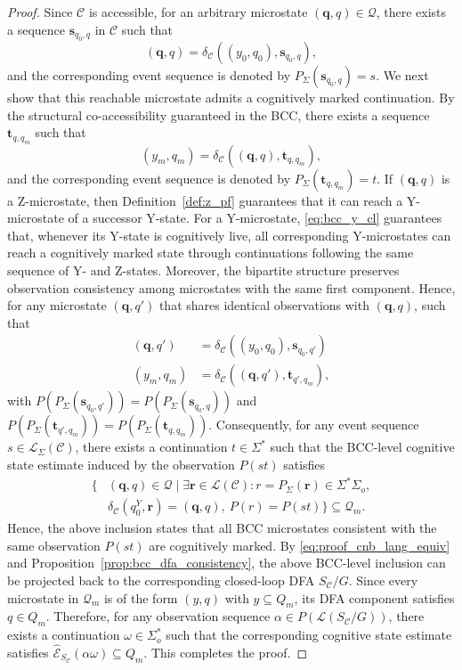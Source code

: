 \documentclass[journal,twoside,web]{ieeecolor}
\begin{document}
\begin{proof}
Since $\mathcal{C}$ is accessible, for an arbitrary microstate $(\bm{q}, q) \in \bm{\mathcal{Q}}$, there exists a sequence $\bm{s}_{q_0, q}$ in $\mathcal{C}$ such that
$$
(\bm{q}, q) = \delta_{\mathcal{C}}((y_0, q_0), \bm{s}_{q_0, q}),
$$
%
and the corresponding event sequence is denoted by
$P_\Sigma(\bm{s}_{q_0, q}) = s$.
%
We next show that this reachable microstate admits a cognitively marked continuation. 
By the structural co-accessibility guaranteed in the BCC, there exists a sequence $\bm{t}_{q, q_m}$ such that
$$
(y_m, q_m) = \delta_{\mathcal{C}}((\bm{q}, q), \bm{t}_{q, q_m}),
$$
and the corresponding event sequence is denoted by $P_\Sigma(\bm{t}_{q, q_m}) = t$.
%
If $(\bm{q},q)$ is a Z-microstate, then Definition~\ref{def:z_pf} guarantees that it can reach a Y-microstate of a successor Y-state.
%
For a Y-microstate, \eqref{eq:bcc_y_cl} guarantees that, whenever its Y-state is cognitively live, all corresponding Y-microstates can reach a cognitively marked state through continuations following the same sequence of Y- and Z-states.
%
Moreover, the bipartite structure preserves observation consistency among microstates with the same first component.
Hence, for any microstate $(\bm{q}, q')$ that shares identical observations with $(\bm{q}, q)$, such that
$$
\begin{aligned}
    (\bm{q}, q') &= \delta_{\mathcal{C}}((y_0, q_0),   \bm{s}_{q_0, q'}) \\
    (y_m,   q_m) &= \delta_{\mathcal{C}}((\bm{q}, q'), \bm{t}_{q', q_m}),
\end{aligned}
$$
with
$
P(P_\Sigma(\bm{s}_{q_0, q'})) = P(P_\Sigma(\bm{s}_{q_0, q}))
$
and
$
P(P_\Sigma(\bm{t}_{q', q_m})) = P(P_\Sigma(\bm{t}_{q, q_m})).
$
Consequently, for any event sequence 
$s \in \mathcal{L}_{\Sigma}(\mathcal{C})$, there exists a continuation 
$t \in \Sigma^*$ such that the BCC-level cognitive state estimate induced by the observation $P(st)$ satisfies
%
$$
\begin{aligned}
\{ &(\bm{q}, q) \in \bm{\mathcal{Q}} \mid 
\exists \bm{r} \in \mathcal{L}(\mathcal{C}) :  
r = P_{\Sigma}(\bm{r}) \in \Sigma^*\Sigma_o, \\
& \delta_{\mathcal{C}}(q_0^Y,\bm{r}) = (\bm{q},q),\
P(r) = P(st) \}
\subseteq \bm{\mathcal{Q}}_m .
\end{aligned}
$$
%
Hence, the above inclusion states that all BCC microstates consistent with the same observation $P(st)$ are cognitively marked.
%
By \eqref{eq:proof_cnb_lang_equiv} and Proposition~\ref{prop:bcc_dfa_consistency}, the above BCC-level inclusion can be projected back to the corresponding closed-loop DFA $S_{\mathcal{C}}/G$. Since every microstate in $\bm{\mathcal{Q}}_m$ is of the form $(y,q)$ with $y\subseteq Q_m$, its DFA component satisfies $q\in Q_m$. 
Therefore, for any observation sequence $\alpha \in P(\mathcal{L}(S_{\mathcal{C}}/G))$, there exists a continuation $\omega \in \Sigma_o^*$ such that the corresponding cognitive state estimate satisfies 
$
\hat{\mathcal{E}}_{S_{\mathcal{C}}}(\alpha\omega) \subseteq Q_m .
$
This completes the proof.
\end{proof}
\end{document}
